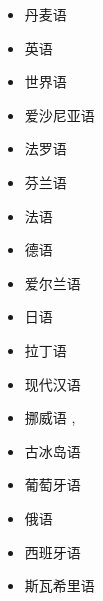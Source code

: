 \begin{itemize}
\item 丹麦语       \citep{Bick2001a-u,BN2007a-u}
\item 英语     \citep{MIF85a,SN86a,LR87a,Hudson89a,ST91a-u,VHA92a-u,IKKLP92a-u,Coch96a}
\item 世界语 \citep{Bick2009a-u} 
\item 爱沙尼亚语   \citep*{Mueuerisep99a-u,MPMKRU2003a-u}
\item 法罗语     \citep{Trosterud2009a-u}
\item 芬兰语     \citep*{NJL84a-u,JLV86a-u}
\item 法语       \citep{IKKLP92a-u,Coch96a,Bick2010a-u}
\item 德语       \citep{Hellwig86a-u,Coch96a,HKMS98a-u,MS98c-u,Hellwig2003a,Hellwig2006a,GK2001a}
\item 爱尔兰语         \citep{DvG2006a-u}
\item 日语   \citep*{MIF85a}
\item 拉丁语         \citep{Covington90a}
\item 现代汉语 \citep{LW2006a-u,Liu2009a-u}
\item 挪威语               \citep*{HBN2000a-u},
\item 古冰岛语       \citep{Maas77a}
\item 葡萄牙语             \citep{Bick2003a-u} 
\item 俄语                   \citep{HZ60a-u,Melcuk64a-u,Covington90a}
\item 西班牙语                   \citep{Coch96a,Bick2006a-u}
\item 斯瓦希里语                   \citep{Hurskainen2006a-u}

\end{itemize}
